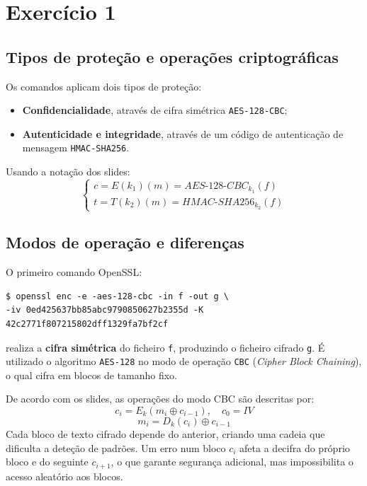 % 
%  
%
\chapter{Exercício 1}
\label{cha:exercise_1}

\section{Tipos de proteção e operações criptográficas}

Os comandos aplicam dois tipos de proteção:
\begin{itemize}
  \item \textbf{Confidencialidade}, através de cifra simétrica \texttt{AES-128-CBC};
  \item \textbf{Autenticidade e integridade}, através de um código de autenticação de mensagem \texttt{HMAC-SHA256}.
\end{itemize}

Usando a notação dos slides:
\[
\begin{cases}
c = E(k_1)(m) = AES\text{-}128\text{-}CBC_{k_1}(f) \\
t = T(k_2)(m) = HMAC\text{-}SHA256_{k_2}(f)
\end{cases}
\]

\section{Modos de operação e diferenças}

O primeiro comando OpenSSL:
\begin{verbatim}
$ openssl enc -e -aes-128-cbc -in f -out g \
-iv 0ed425637bb85abc9790850627b2355d -K 42c2771f807215802dff1329fa7bf2cf
\end{verbatim}

realiza a \textbf{cifra simétrica} do ficheiro \texttt{f}, produzindo o ficheiro cifrado \texttt{g}. 
É utilizado o algoritmo \texttt{AES-128} no modo de operação \texttt{CBC} (\textit{Cipher Block Chaining}), o qual cifra em blocos de tamanho fixo. 

De acordo com os slides, as operações do modo CBC são descritas por:
\[
c_i = E_k(m_i \oplus c_{i-1}), \quad c_0 = IV
\]
\[
m_i = D_k(c_i) \oplus c_{i-1}
\]
Cada bloco de texto cifrado depende do anterior, criando uma cadeia que dificulta a deteção de padrões. 
Um erro num bloco $c_i$ afeta a decifra do próprio bloco e do seguinte $c_{i+1}$, o que garante segurança adicional, mas impossibilita o acesso aleatório aos blocos.


